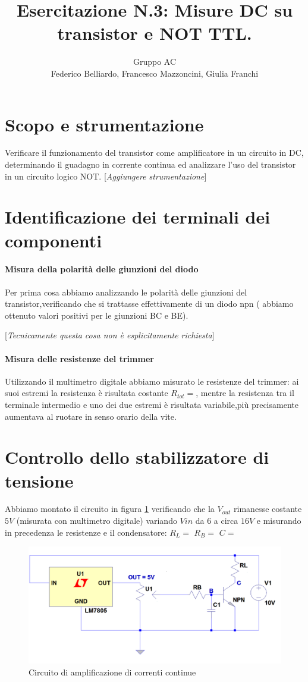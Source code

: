 \documentclass[10pt,a4paper]{article}
\author{Gruppo AC \\ Federico Belliardo, Francesco Mazzoncini, Giulia Franchi}
\title{Esercitazione N.3: Misure DC su transistor e NOT TTL.}
\newcommand{\rem}[1]{[\emph{#1}]}
\begin{document}
\maketitle
\section{Scopo e strumentazione}
Verificare il funzionamento del transistor come amplificatore in un circuito in DC, determinando il guadagno in corrente continua ed analizzare l'uso del transistor in un circuito logico NOT.
\rem{Aggiungere strumentazione}

\section{Identificazione dei terminali dei componenti}

\paragraph{Misura della polarità delle giunzioni del diodo}
Per prima cosa abbiamo analizzando le polarità delle giunzioni del transistor,verificando che si trattasse effettivamente  di un diodo npn ( abbiamo ottenuto valori positivi per le giunzioni BC e BE).

\rem{Tecnicamente questa cosa non è esplicitamente richiesta}
\paragraph{Misura delle resistenze del trimmer}
Utilizzando il multimetro digitale abbiamo misurato le resistenze del trimmer: ai suoi estremi la resistenza è risultata costante $R_{tot}=$, mentre la resistenza tra il terminale intermedio e uno dei due estremi è risultata variabile,più precisamente aumentava  al ruotare in senso orario della vite.
\section{Controllo dello stabilizzatore di tensione}
Abbiamo montato il circuito in  figura \ref{circuito} verificando che  la $V_{out}$ rimanesse costante $5V$ (misurata con multimetro digitale) variando $V{in}$ da 6 a circa  $16V$ e misurando in precedenza le resistenze e il condensatore: $R_L=$  $R_B=$  $C=$
\begin{figure}[!htb]
  \centering
  \includegraphics[scale=0.4]{circuito}
\caption{Circuito di amplificazione di correnti continue}
\label{circuito}
\end{figure}
\end{document}
